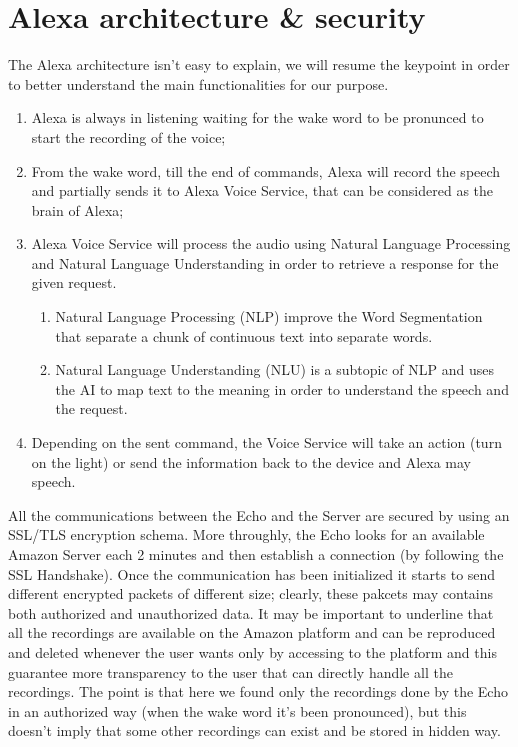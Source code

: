 \documentclass[sigconf]{acmart}
\begin{document}
    \section{Alexa architecture \& security}
    The Alexa architecture isn't easy to explain, we will resume the keypoint in order to better understand the main functionalities for our purpose.
    \begin{enumerate}
        \item Alexa is always in listening waiting for the wake word to be pronunced to start the recording of the voice;
        \item From the wake word, till the end of commands, Alexa will record the speech and partially sends it to Alexa Voice Service, that can be considered as the brain of Alexa;
        \item Alexa Voice Service will process the audio using Natural Language Processing and Natural Language Understanding in order to retrieve a response for the given request.
        \begin{enumerate}
            \item Natural Language Processing (NLP) improve the Word Segmentation that separate a chunk of continuous text into separate words.
            \item Natural Language Understanding (NLU) is a subtopic of NLP and uses the AI to map text to the meaning\cite{NLU} in order to understand the speech and the request.
        \end{enumerate}
        \item Depending on the sent command, the Voice Service will take an action (turn on the light) or send the information back to the device and Alexa may speech.
    \end{enumerate}
    All the communications between the Echo and the Server are secured by using an SSL/TLS encryption schema.
    More throughly, the Echo looks for an available Amazon Server each 2 minutes and then establish a connection (by following the SSL Handshake).
    Once the communication has been initialized it starts to send different encrypted packets of different size; clearly, these pakcets may contains both authorized and unauthorized data.
    It may be important to underline that all the recordings are available on the Amazon platform and can be reproduced and deleted whenever the user wants only by accessing to the platform and this guarantee more transparency to the user that can directly handle all the recordings.
    The point is that here we found only the recordings done by the Echo in an authorized way (when the wake word it's been pronounced), but this doesn't imply that some other recordings can exist and be stored in hidden way.
\end{document}
